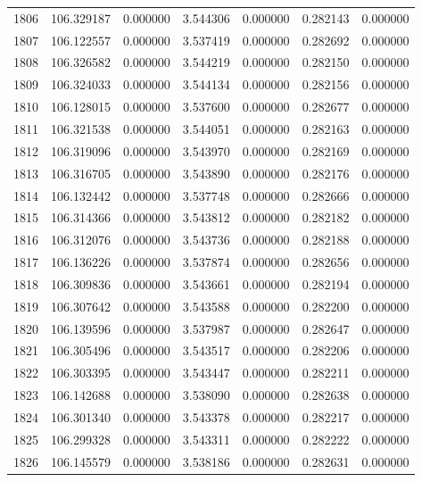 \begin{tabular}{rrrrrrr}
1806 & 106.329187 &    0.000000 &  3.544306 &   0.000000 &   0.282143 &  0.000000 \\
1807 & 106.122557 &    0.000000 &  3.537419 &   0.000000 &   0.282692 &  0.000000 \\
1808 & 106.326582 &    0.000000 &  3.544219 &   0.000000 &   0.282150 &  0.000000 \\
1809 & 106.324033 &    0.000000 &  3.544134 &   0.000000 &   0.282156 &  0.000000 \\
1810 & 106.128015 &    0.000000 &  3.537600 &   0.000000 &   0.282677 &  0.000000 \\
1811 & 106.321538 &    0.000000 &  3.544051 &   0.000000 &   0.282163 &  0.000000 \\
1812 & 106.319096 &    0.000000 &  3.543970 &   0.000000 &   0.282169 &  0.000000 \\
1813 & 106.316705 &    0.000000 &  3.543890 &   0.000000 &   0.282176 &  0.000000 \\
1814 & 106.132442 &    0.000000 &  3.537748 &   0.000000 &   0.282666 &  0.000000 \\
1815 & 106.314366 &    0.000000 &  3.543812 &   0.000000 &   0.282182 &  0.000000 \\
1816 & 106.312076 &    0.000000 &  3.543736 &   0.000000 &   0.282188 &  0.000000 \\
1817 & 106.136226 &    0.000000 &  3.537874 &   0.000000 &   0.282656 &  0.000000 \\
1818 & 106.309836 &    0.000000 &  3.543661 &   0.000000 &   0.282194 &  0.000000 \\
1819 & 106.307642 &    0.000000 &  3.543588 &   0.000000 &   0.282200 &  0.000000 \\
1820 & 106.139596 &    0.000000 &  3.537987 &   0.000000 &   0.282647 &  0.000000 \\
1821 & 106.305496 &    0.000000 &  3.543517 &   0.000000 &   0.282206 &  0.000000 \\
1822 & 106.303395 &    0.000000 &  3.543447 &   0.000000 &   0.282211 &  0.000000 \\
1823 & 106.142688 &    0.000000 &  3.538090 &   0.000000 &   0.282638 &  0.000000 \\
1824 & 106.301340 &    0.000000 &  3.543378 &   0.000000 &   0.282217 &  0.000000 \\
1825 & 106.299328 &    0.000000 &  3.543311 &   0.000000 &   0.282222 &  0.000000 \\
1826 & 106.145579 &    0.000000 &  3.538186 &   0.000000 &   0.282631 &  0.000000 \\

\end{tabular}
